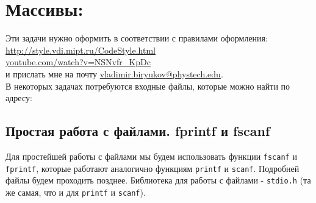 \documentclass{article}
\begin{document}


\section*{Массивы:}

Эти задачи нужно оформить в соответствии с правилами оформления: \\ 
\href{http://style.vdi.mipt.ru/CodeStyle.html}{http://style.vdi.mipt.ru/CodeStyle.html}\\
\href{https://www.youtube.com/watch?v=NSNvfr_KpDc}{youtube.com/watch?v=NSNvfr\_KpDc}\\
 и прислать мне на почту \href{mailto:vladimir.biryukov@phystech.edu}{vladimir.biryukov@phystech.edu}.\\
 
В некоторых задачах потребуются входные файлы, которые можно найти по адресу:


\subsection{Простая работа с файлами. fprintf и fscanf}
Для простейшей работы с файлами мы будем использовать функции \texttt{fscanf} и \texttt{fprintf}, которые работают аналогично функциям \texttt{printf} и \texttt{scanf}. Подробней файлы будем проходить позднее. Библиотека для работы с файлами - \texttt{stdio.h} (та же самая, что и для \texttt{printf} и \texttt{scanf}). \\
\end{document}
